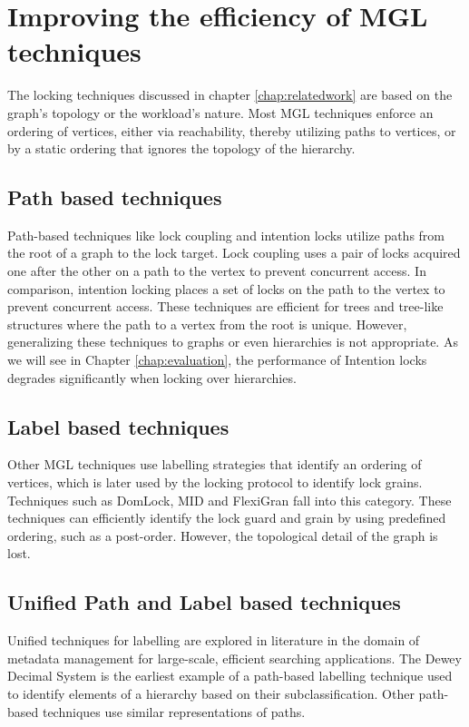 \section{Improving the efficiency of MGL techniques}

The locking techniques discussed in chapter \ref{chap:relatedwork} are based on the graph's topology or the workload's nature. Most MGL techniques enforce an ordering of vertices, either via reachability, thereby utilizing paths to vertices, or by a static ordering that ignores the topology of the hierarchy.

\subsection{Path based techniques}
Path-based techniques like lock coupling \cite{DBLP:journals/acta/BayerS77}  and intention locks \cite{gray1975granularity} utilize paths from the root of a graph to the lock target. Lock coupling uses a pair of locks acquired one after the other on a path to the vertex to prevent concurrent access. In comparison, intention locking places a set of locks on the path to the vertex to prevent concurrent access. These techniques are efficient for trees and tree-like structures where the path to a vertex from the root is unique. However, generalizing these techniques to graphs or even hierarchies is not appropriate. As we will see in Chapter \ref{chap:evaluation}, the performance of Intention locks degrades significantly when locking over hierarchies.

\subsection{Label based techniques}
Other MGL techniques use labelling strategies that identify an ordering of vertices, which is later used by the locking protocol to identify lock grains. Techniques such as DomLock, MID and FlexiGran fall into this category. These techniques can efficiently identify the lock guard and grain by using predefined ordering, such as a post-order. However, the topological detail of the graph is lost.  


\subsection{Unified Path and Label based techniques}
Unified techniques for labelling are explored in literature in the domain of metadata management for large-scale, efficient searching applications. The Dewey Decimal System \cite{DBLP:journals/jd/Sweeney83} is the earliest example of a path-based labelling technique used to identify elements of a hierarchy based on their subclassification. Other path-based techniques use similar representations of paths. 

